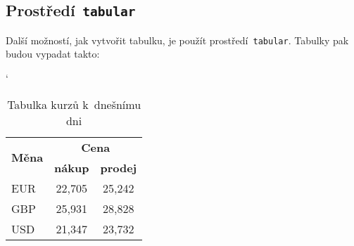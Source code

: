 \documentclass[a4paper, 11pt]{article}
\begin{document}
\subsection{Prostředí\texttt{ tabular}}

Další možností, jak vytvořit tabulku, je použít prostředí\texttt{ tabular}.
Tabulky pak budou vypadat takto\footnotemark[1]:

\bigskip
\begin{table}[h!]
	\catcode`
	\centering
	\begin{tabular}{|l|c|c|}
		\hline
		\multirow{2}{*}{\textbf{Měna}} & \multicolumn{2}{c|}{\textbf{Cena}}                   \\ \cline{2-3}
		                               & \textbf{nákup}                     & \textbf{prodej} \\
		\hline
		EUR                            & 22,705                             & 25,242          \\
		GBP                            & 25,931                             & 28,828          \\
		USD                            & 21,347                             & 23,732          \\
		\hline
	\end{tabular}

	\caption{Tabulka kurzů k~dnešnímu dni}
	\label{tab:kurz}

\end{table}
\end{document}
